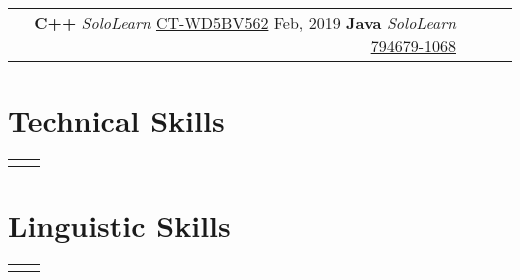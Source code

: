 \documentclass[
	10pt, %
	]{FreemanCV}
\begin{document}
\begin{paracol}{2}
\begin{supertabular}{r l r l}
						{\textbf{C++}}
						{\textit{SoloLearn}}
						{\raisebox{-1pt}{\faExternalLink} \href{https://www.sololearn.com/Certificate/CT-WD5BV562/png}{CT-WD5BV562}}
					{Feb, 2019}
						{\textbf{Java}}
						{\textit{SoloLearn}}
						{\raisebox{-1pt}{\faExternalLink} \href{https://www.sololearn.com/certificates/course/en/794679/1068/landscape/png}{794679-1068}}
	
	
\end{supertabular}


\section{Technical Skills} 




\begin{supertabular}{r l}
\begin{barchart}{5.5}
\end{barchart} \\
\end{supertabular}


\section{Linguistic Skills}

\begin{supertabular}{r l} %
\begin{barchart}{5.5}
\end{barchart} \\
\end{supertabular}


\end{paracol}
\end{document}
